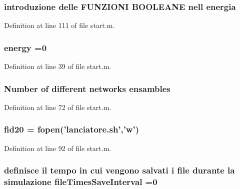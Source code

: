\hypertarget{a00113_a15a0e3f3007df072a07460518322b944}{
\subsubsection[{energia}]{\setlength{\rightskip}{0pt plus 5cm}introduzione delle F\-U\-N\-Z\-I\-O\-N\-I B\-O\-O\-L\-E\-A\-N\-E nell energia}}\label{a00113_a15a0e3f3007df072a07460518322b944}


Definition at line 111 of file start.\-m.

\hypertarget{a00113_ac002779c383d2cc783e881f94449de66}{
\subsubsection[{energy}]{\setlength{\rightskip}{0pt plus 5cm}energy =0}}\label{a00113_ac002779c383d2cc783e881f94449de66}


Definition at line 39 of file start.\-m.

\hypertarget{a00113_a450b0c257ca2430779e4244700c076e7}{
\subsubsection[{ensambles}]{\setlength{\rightskip}{0pt plus 5cm}Number of different networks ensambles}}\label{a00113_a450b0c257ca2430779e4244700c076e7}


Definition at line 72 of file start.\-m.

\hypertarget{a00113_aaad88534fbf3d065202db78a891374ca}{
\subsubsection[{fid20}]{ fid20 = fopen('lanciatore.\-sh','w')}}\label{a00113_aaad88534fbf3d065202db78a891374ca}


Definition at line 92 of file start.\-m.

\hypertarget{a00113_a825ee95e200498001c9f82b9637c1ff5}{
\subsubsection[{file\-Times\-Save\-Interval}]{\setlength{\rightskip}{0pt plus 5cm}definisce il tempo in cui vengono salvati {\bf i} {\bf file} durante la {\bf simulazione} file\-Times\-Save\-Interval =0}}\label{a00113_a825ee95e200498001c9f82b9637c1ff5}


